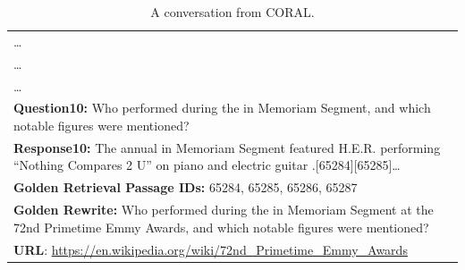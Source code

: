 \documentclass[11pt]{article}
\begin{document}
\begin{table}[http]
\begin{tabular}{p{14cm}}
\dots \\
\dots \\
\dots \\
\textbf{Question10:} Who performed during the in Memoriam Segment, and which notable figures were mentioned?\\
\textbf{Response10:} The annual in Memoriam Segment featured H.E.R. performing ``Nothing Compares 2 U'' on piano and electric guitar .[65284][65285]\dots\\
\textbf{Golden Retrieval Passage IDs:} 65284, 65285, 65286, 65287\\
\textbf{Golden Rewrite:} Who performed during the in Memoriam Segment at the 72nd Primetime Emmy Awards, and which notable figures were mentioned?\\
\textbf{URL}: \url{https://en.wikipedia.org/wiki/72nd_Primetime_Emmy_Awards}\\



\bottomrule

\end{tabular}
\caption{A conversation from CORAL.}
\label{example_of_coral}
\end{table}
\end{document}
